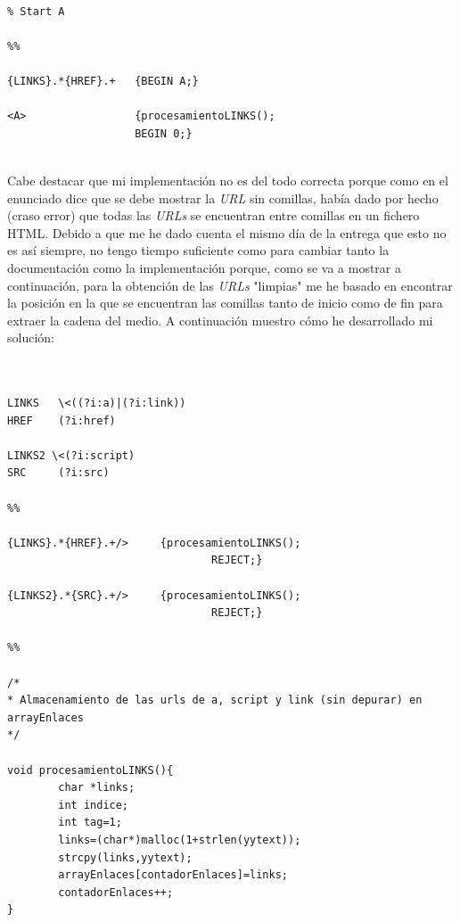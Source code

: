\documentclass[10pt, a4paper,spanish]{article}
\begin{document}
\newpage
 \begin{lstlisting}
 
% Start A

%%

{LINKS}.*{HREF}.+   {BEGIN A;}

<A>                 {procesamientoLINKS();
                    BEGIN 0;}

\end{lstlisting}

\noindent \\ Cabe destacar que mi implementación no es del todo correcta porque como en el enunciado dice que se debe mostrar la \textit{URL} sin comillas, había dado por hecho (craso error) que todas las \textit{URLs} se encuentran entre comillas en un fichero HTML. Debido a que me he dado cuenta el mismo día de la entrega que esto no es así siempre, no tengo tiempo suficiente como para cambiar tanto la documentación como la implementación porque, como se va a mostrar a continuación, para la obtención de las \textit{URLs} "limpias" me he basado en encontrar la posición en la que se encuentran las comillas tanto de inicio como de fin para extraer la cadena del medio. A continuación muestro cómo he desarrollado mi solución: 

 \begin{lstlisting}


LINKS   \<((?i:a)|(?i:link))
HREF    (?i:href)

LINKS2 \<(?i:script)
SRC     (?i:src)

%%

{LINKS}.*{HREF}.+/>     {procesamientoLINKS();
                                REJECT;}

{LINKS2}.*{SRC}.+/>     {procesamientoLINKS();
                                REJECT;}

%%

/*
* Almacenamiento de las urls de a, script y link (sin depurar) en arrayEnlaces
*/

void procesamientoLINKS(){
        char *links;
        int indice;
        int tag=1;
        links=(char*)malloc(1+strlen(yytext));
        strcpy(links,yytext);
        arrayEnlaces[contadorEnlaces]=links;
        contadorEnlaces++;
}

\end{lstlisting}
\end{document}
